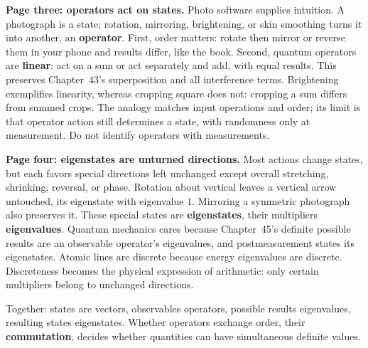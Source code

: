 \begin{center}
\end{center}

\textbf{Page three: operators act on states.} Photo software supplies intuition. A photograph is a state; rotation, mirroring, brightening, or skin smoothing turns it into another, an \textbf{operator}. First, order matters: rotate then mirror or reverse them in your phone and results differ, like the book. Second, quantum operators are \textbf{linear}: act on a sum or act separately and add, with equal results. This preserves Chapter~43's superposition and all interference terms. Brightening exemplifies linearity, whereas cropping square does not: cropping a sum differs from summed crops. The analogy matches input operations and order; its limit is that operator action still determines a state, with randomness only at measurement. Do not identify operators with measurements.

\textbf{Page four: eigenstates are unturned directions.} Most actions change states, but each favors special directions left unchanged except overall stretching, shrinking, reversal, or phase. Rotation about vertical leaves a vertical arrow untouched, its eigenstate with eigenvalue $1$. Mirroring a symmetric photograph also preserves it. These special states are \textbf{eigenstates}, their multipliers \textbf{eigenvalues}. Quantum mechanics cares because Chapter~45's definite possible results are an observable operator's eigenvalues, and postmeasurement states its eigenstates. Atomic lines are discrete because energy eigenvalues are discrete. Discreteness becomes the physical expression of arithmetic: only certain multipliers belong to unchanged directions.

Together: states are vectors, observables operators, possible results eigenvalues, resulting states eigenstates. Whether operators exchange order, their \textbf{commutation}, decides whether quantities can have simultaneous definite values.

